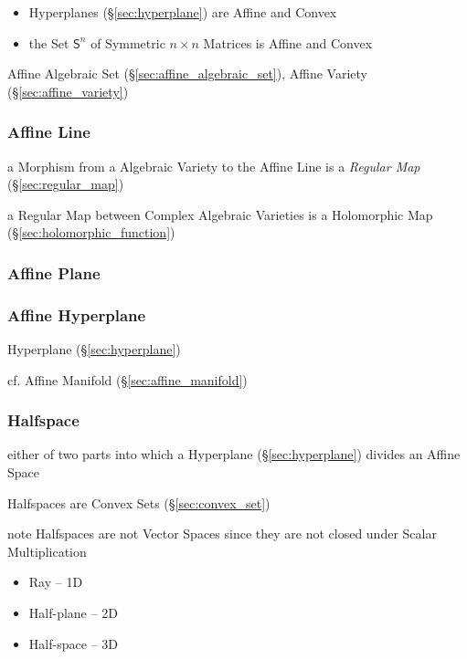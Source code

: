 \begin{itemize}
  \item Hyperplanes (\S\ref{sec:hyperplane}) are Affine and Convex
  \item the Set $\mathsf{S}^n$ of Symmetric $n \times n$ Matrices is Affine and
    Convex
\end{itemize}

\fist Affine Algebraic Set (\S\ref{sec:affine_algebraic_set}), Affine Variety
(\S\ref{sec:affine_variety})



\subsubsection{Affine Line}\label{sec:affine_line}

a Morphism from a Algebraic Variety to the Affine Line is a \emph{Regular Map}
(\S\ref{sec:regular_map})

a Regular Map between Complex Algebraic Varieties is a Holomorphic Map
(\S\ref{sec:holomorphic_function})



\subsubsection{Affine Plane}\label{sec:affine_plane}

\subsubsection{Affine Hyperplane}\label{sec:affine_hyperplane}

Hyperplane (\S\ref{sec:hyperplane})

cf. Affine Manifold (\S\ref{sec:affine_manifold})



\subsubsection{Halfspace}\label{sec:halfspace}

either of two parts into which a Hyperplane (\S\ref{sec:hyperplane}) divides an
Affine Space

Halfspaces are Convex Sets (\S\ref{sec:convex_set})

note Halfspaces are not Vector Spaces since they are not closed under Scalar
Multiplication

\begin{itemize}
  \item Ray -- 1D
  \item Half-plane -- 2D
  \item Half-space -- 3D
\end{itemize}



